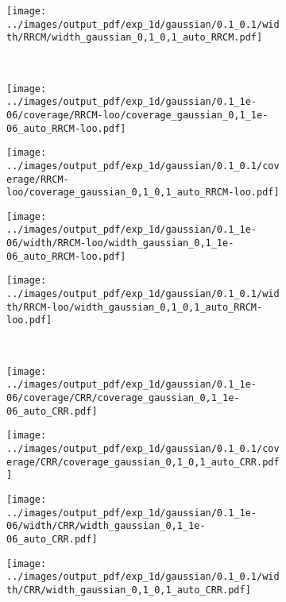 \documentclass[conference]{IEEEtran}
\begin{document}
\begin{figure}
\begin{subfigure}[b]{0.25\linewidth}
  \end{subfigure}%
  \begin{subfigure}[b]{0.25\linewidth}
    \texttt{[image: ../images/output\_pdf/exp\_1d/gaussian/0.1\_0.1/width/RRCM/width\_gaussian\_0,1\_0,1\_auto\_RRCM.pdf]}
  \end{subfigure}\\
  \begin{subfigure}[b]{0.25\linewidth}
    \texttt{[image: ../images/output\_pdf/exp\_1d/gaussian/0.1\_1e-06/coverage/RRCM-loo/coverage\_gaussian\_0,1\_1e-06\_auto\_RRCM-loo.pdf]}
  \end{subfigure}%
  \begin{subfigure}[b]{0.25\linewidth}
    \texttt{[image: ../images/output\_pdf/exp\_1d/gaussian/0.1\_0.1/coverage/RRCM-loo/coverage\_gaussian\_0,1\_0,1\_auto\_RRCM-loo.pdf]}
  \end{subfigure}%
  \begin{subfigure}[b]{0.25\linewidth}
    \texttt{[image: ../images/output\_pdf/exp\_1d/gaussian/0.1\_1e-06/width/RRCM-loo/width\_gaussian\_0,1\_1e-06\_auto\_RRCM-loo.pdf]}
  \end{subfigure}%
  \begin{subfigure}[b]{0.25\linewidth}
    \texttt{[image: ../images/output\_pdf/exp\_1d/gaussian/0.1\_0.1/width/RRCM-loo/width\_gaussian\_0,1\_0,1\_auto\_RRCM-loo.pdf]}
  \end{subfigure}\\
  \begin{subfigure}[b]{0.25\linewidth}
    \texttt{[image: ../images/output\_pdf/exp\_1d/gaussian/0.1\_1e-06/coverage/CRR/coverage\_gaussian\_0,1\_1e-06\_auto\_CRR.pdf]}
  \end{subfigure}%
  \begin{subfigure}[b]{0.25\linewidth}
    \texttt{[image: ../images/output\_pdf/exp\_1d/gaussian/0.1\_0.1/coverage/CRR/coverage\_gaussian\_0,1\_0,1\_auto\_CRR.pdf]}
  \end{subfigure}%
  \begin{subfigure}[b]{0.25\linewidth}
    \texttt{[image: ../images/output\_pdf/exp\_1d/gaussian/0.1\_1e-06/width/CRR/width\_gaussian\_0,1\_1e-06\_auto\_CRR.pdf]}
  \end{subfigure}%
  \begin{subfigure}[b]{0.25\linewidth}
    \texttt{[image: ../images/output\_pdf/exp\_1d/gaussian/0.1\_0.1/width/CRR/width\_gaussian\_0,1\_0,1\_auto\_CRR.pdf]}

\end{subfigure}
\end{figure}
\end{document}
